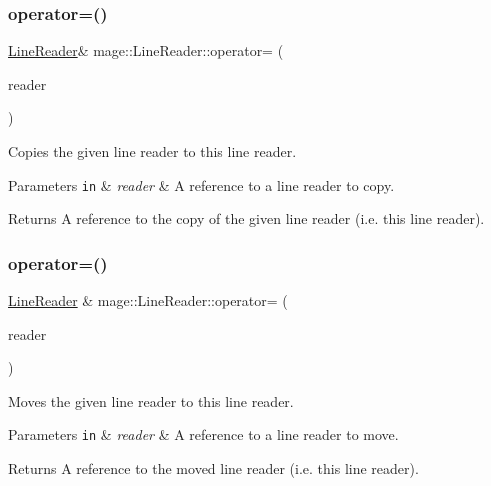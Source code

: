 \subsubsection{\texorpdfstring{operator=()}{operator=()}\hspace{0.1cm}{\footnotesize\ttfamily [1/2]}}
{\footnotesize\ttfamily \mbox{\hyperlink{classmage_1_1_line_reader}{Line\+Reader}}\& mage\+::\+Line\+Reader\+::operator= (\begin{DoxyParamCaption}\item[{const \mbox{\hyperlink{classmage_1_1_line_reader}{Line\+Reader}} \&}]{reader }\end{DoxyParamCaption})\hspace{0.3cm}{\ttfamily [delete]}}

Copies the given line reader to this line reader.


\begin{DoxyParams}[1]{Parameters}
\mbox{\tt in}  & {\em reader} & A reference to a line reader to copy. \\
\hline
\end{DoxyParams}
\begin{DoxyReturn}{Returns}
A reference to the copy of the given line reader (i.\+e. this line reader). 
\end{DoxyReturn}
\mbox{\label{classmage_1_1_line_reader_a3ba691cb32a1ab5dcbe75498068c1b86}} 
\subsubsection{\texorpdfstring{operator=()}{operator=()}\hspace{0.1cm}{\footnotesize\ttfamily [2/2]}}
{\footnotesize\ttfamily \mbox{\hyperlink{classmage_1_1_line_reader}{Line\+Reader}} \& mage\+::\+Line\+Reader\+::operator= (\begin{DoxyParamCaption}\item[{\mbox{\hyperlink{classmage_1_1_line_reader}{Line\+Reader}} \&\&}]{reader }\end{DoxyParamCaption})\hspace{0.3cm}{\ttfamily [noexcept]}}

Moves the given line reader to this line reader.


\begin{DoxyParams}[1]{Parameters}
\mbox{\tt in}  & {\em reader} & A reference to a line reader to move. \\
\hline
\end{DoxyParams}
\begin{DoxyReturn}{Returns}
A reference to the moved line reader (i.\+e. this line reader). 
\end{DoxyReturn}
\mbox{\label{classmage_1_1_line_reader_a51775e07b5f7c9f72441e42d6d3896e1}} 
